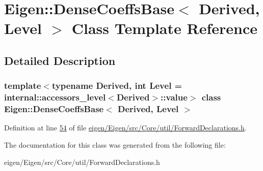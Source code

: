 \hypertarget{class_eigen_1_1_dense_coeffs_base}{}\section{Eigen\+:\+:Dense\+Coeffs\+Base$<$ Derived, Level $>$ Class Template Reference}
\label{class_eigen_1_1_dense_coeffs_base}


\subsection{Detailed Description}
\subsubsection*{template$<$typename Derived, int Level = internal\+::accessors\+\_\+level$<$\+Derived$>$\+::value$>$\newline
class Eigen\+::\+Dense\+Coeffs\+Base$<$ Derived, Level $>$}



Definition at line \hyperlink{eigen_2_eigen_2src_2_core_2util_2_forward_declarations_8h_source_l00054}{54} of file \hyperlink{eigen_2_eigen_2src_2_core_2util_2_forward_declarations_8h_source}{eigen/\+Eigen/src/\+Core/util/\+Forward\+Declarations.\+h}.



The documentation for this class was generated from the following file\+:\begin{DoxyCompactItemize}
\item 
eigen/\+Eigen/src/\+Core/util/\+Forward\+Declarations.\+h\end{DoxyCompactItemize}
